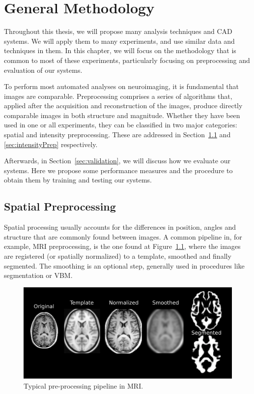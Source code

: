 \chapter{General Methodology}\label{ch:preprocessing} %
Throughout this thesis, we will propose many analysis techniques and \ac{CAD} systems. We will apply them to many experiments, and use similar data and techniques in them. In this chapter, we will focus on the methodology that is common to most of these experiments, particularly focusing on preprocessing and evaluation of our systems. 

To perform most automated analyses on neuroimaging, it is fundamental that images are comparable. Preprocessing comprises a series of algorithms that, applied after the acquisition and reconstruction of the images, produce directly comparable images in both structure and magnitude. Whether they have been used in one or all experiments, they can be classified in two major categories: spatial and intensity preprocessing. These are addressed in Section~\ref{sec:spatial} and \ref{sec:intensityPrep} respectively. 

Afterwards, in Section~\ref{sec:validation}, we will discuss how we evaluate our systems. Here we propose some performance measures and the procedure to obtain them by training and testing our systems.  


\section{Spatial Preprocessing}\label{sec:spatial}
Spatial processing usually accounts for the differences in position, angles and structure that are commonly found between images. A common pipeline in, for example, \ac{MRI} preprocessing, is the one found at Figure~\ref{fig:examplePreMRI}, where the images are registered (or spatially normalized) to a template, smoothed and finally segmented. The smoothing is an optional step, generally used in procedures like segmentation or \ac{VBM}. 

\begin{figure}[htp]
	\myfloatalign
	\includegraphics[width=.7\linewidth]{Graphics/ch3/preProcessPL}
	\caption[Typical pre-processing pipeline in MRI]{Typical pre-processing pipeline in \ac{MRI}.}\label{fig:examplePreMRI}
\end{figure}

